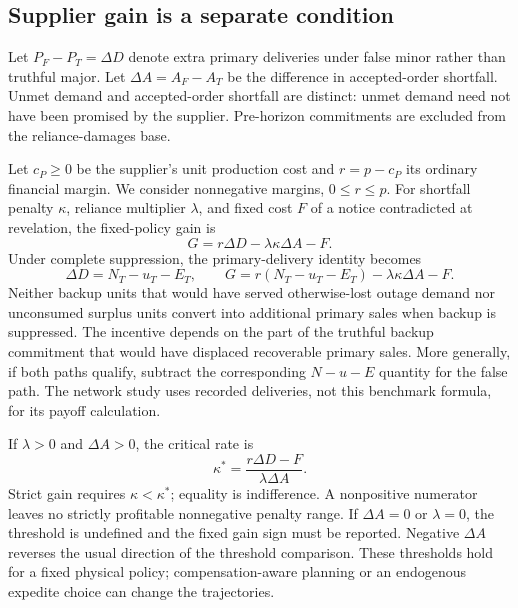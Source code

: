 \documentclass[preprint,11pt,authoryear]{elsarticle}
\begin{document}
\subsection{Supplier gain is a separate condition}
Let $P_F-P_T=\Delta D$ denote extra primary deliveries under false minor rather than truthful major. Let $\Delta A=A_F-A_T$ be the difference in accepted-order shortfall. Unmet demand and accepted-order shortfall are distinct: unmet demand need not have been promised by the supplier. Pre-horizon commitments are excluded from the reliance-damages base.

Let $c_P\ge0$ be the supplier's unit production cost and $r=p-c_P$ its ordinary financial margin. We consider nonnegative margins, $0\le r\le p$. For shortfall penalty $\kappa$, reliance multiplier $\lambda$, and fixed cost $F$ of a notice contradicted at revelation, the fixed-policy gain is
\begin{equation}
 G=r\Delta D-\lambda\kappa\Delta A-F.\label{eq:gain}
\end{equation}
Under complete suppression, the primary-delivery identity becomes
\begin{equation}
 \Delta D=N_T-u_T-E_T,\qquad
 G=r(N_T-u_T-E_T)-\lambda\kappa\Delta A-F.\label{eq:displacement}
\end{equation}
Neither backup units that would have served otherwise-lost outage demand nor unconsumed surplus units convert into additional primary sales when backup is suppressed. The incentive depends on the part of the truthful backup commitment that would have displaced recoverable primary sales. More generally, if both paths qualify, subtract the corresponding $N-u-E$ quantity for the false path. The network study uses recorded deliveries, not this benchmark formula, for its payoff calculation.

If $\lambda>0$ and $\Delta A>0$, the critical rate is
\begin{equation}
 \kappa^*=\frac{r\Delta D-F}{\lambda\Delta A}.\label{eq:critical}
\end{equation}
Strict gain requires $\kappa<\kappa^*$; equality is indifference. A nonpositive numerator leaves no strictly profitable nonnegative penalty range. If $\Delta A=0$ or $\lambda=0$, the threshold is undefined and the fixed gain sign must be reported. Negative $\Delta A$ reverses the usual direction of the threshold comparison. These thresholds hold for a fixed physical policy; compensation-aware planning or an endogenous expedite choice can change the trajectories.
\end{document}
